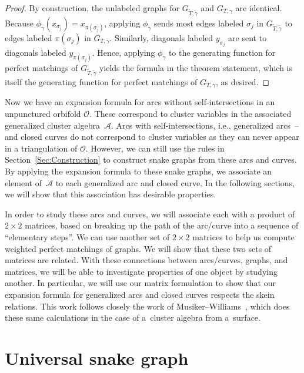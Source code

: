 \documentclass[pdftex]{sigma}%
\numberwithin{equation}{section}
\begin{document}
\begin{proof}
By construction, the unlabeled graphs for $G_{\widetilde{T},\widetilde{\gamma}}$ and $G_{T,\gamma}$ are identical. Because $\phi_\gamma(x_{\sigma_j}) = x_{\pi(\sigma_j)}$,
applying $\phi_\gamma$ sends most edges labeled $\sigma_j$ in $G_{\widetilde{T},\widetilde{\gamma}}$ to edges labeled $\pi(\sigma_j)$ in $G_{T,\gamma}$. Similarly, diagonals labeled $y_{\sigma_j}$ are sent to diagonals labeled $y_{\pi(\sigma_j)}$. Hence, applying $\phi_\gamma$ to the generating function for perfect matchings of $G_{\widetilde{T},\widetilde{\gamma}}$ yields the formula in the theorem statement, which is itself the generating function for perfect matchings of $G_{T,\gamma}$, as desired.
 \end{proof}

Now we have an expansion formula for arcs without self-intersections in an unpunctured orbifold $\mathcal{O}$. These correspond to cluster variables in the associated generalized cluster algebra~$\mathcal{A}$. Arcs with self-intersections, i.e., generalized arcs~-- and closed curves do not correspond to cluster variables as they can never appear in a triangulation of $\mathcal{O}$. However, we can still use the rules in Section~\ref{Sec:Construction} to construct snake graphs from these arcs and curves. By applying the expansion formula to these snake graphs, we associate an element of~$\mathcal{A}$ to each generalized arc and closed curve. In the following sections, we will show that this association has desirable properties.

In order to study these arcs and curves, we will associate each with a product of $2\times 2$ matrices, based on breaking up the path of the arc/curve into a sequence of ``elementary steps''. We can use another set of $2\times 2$ matrices to help us compute weighted perfect matchings of graphs. We will show that these two sets of matrices are related. With these connections between arcs/curves, graphs, and matrices, we will be able to investigate properties of one object by studying another. In particular, we will use our matrix formulation to show that our expansion formula for generalized arcs and closed curves respects the skein relations. This work follows closely the work of Musiker--Williams~\cite{MW}, which does these same calculations in the case of a~cluster algebra from a~surface.

\section{Universal snake graph}\label{sec:universalSnakeGraph}
\end{document}
